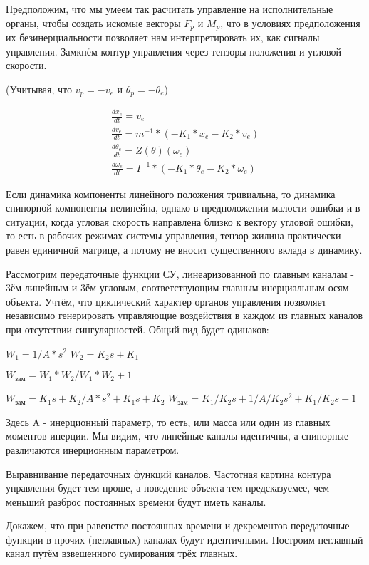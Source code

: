 \documentclass[a4paper]{article}
\begin{document}
Предположим, что мы умеем так расчитать управление на исполнительные органы, чтобы создать искомые векторы $F_p$ и $M_p$, что в условиях предположения их безинерциальности позволяет нам интерпретировать их, как сигналы управления. Замкнём контур управления через тензоры положения и угловой скорости.

(Учитывая, что $v_p = -v_e$ и $\theta_p = -\theta_e$)

 \begin{align}
\frac{dx_e}{dt} = v_e \\
\frac{dv_e}{dt} = m^{-1} * (-K_1*x_e -K_2*v_e) \\
\frac{d\theta_e}{dt} = Z(\theta)(\omega_e) \\
\frac{d\omega_e}{dt} = I^{-1} * (-K_1*\theta_e -K_2*\omega_e)
\end{align}

Если динамика компоненты линейного положения тривиальна, то динамика спинорной компоненты нелинейна, однако в предположении малости ошибки и в ситуации, когда угловая скорость направлена близко к вектору угловой ошибки, то есть в рабочих режимах системы управления, тензор жилина практически равен единичной матрице, а потому не вносит существенного вклада в динамику. 

Рассмотрим передаточные функции СУ, линеаризованной по главным каналам - 3ём линейным и 3ём угловым, соответствующим главным инерциальным осям объекта. Учтём, что циклический характер органов управления позволяет независимо генерировать управляющие воздействия в каждом из главных каналов при отсутствии сингулярностей. Общий вид будет одинаков:

$W_1 = 1/A*s^2$
$W_2 = K_2s + K_1$

$W_{зам} = W_1 * W_2 / W_1 * W_2 + 1$

$W_{зам} = K_1s + K_2 / A*s^2 + K_1s + K_2$
$W_{зам} = K_1/K_2s + 1 / A/K_2s^2 + K_1/K_2s + 1$

Здесь A - инерционный параметр, то есть, или масса или один из главных моментов инерции. Мы видим, что линейные каналы идентичны, а спинорные различаются инерционным параметром.

Выравнивание передаточных функций каналов.
Частотная картина контура управления будет тем проще, а поведение объекта тем предсказуемее, чем меньший разброс постоянных времени будут иметь каналы.

Докажем, что при равенстве постоянных времени и декрементов передаточные функции в прочих (неглавных) каналах будут идентичными. Построим неглавный канал путём взвешенного сумирования трёх главных.
\end{document}
